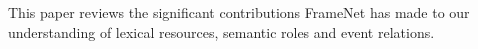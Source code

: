 This paper reviews the significant contributions FrameNet has made to our understanding of lexical resources, semantic roles and event relations.

